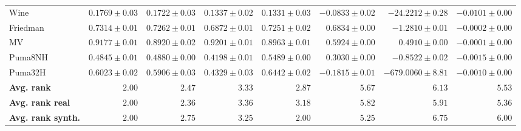 \begin{table*}[!htbp]
{\begin{tabular}{lrrrrrrr}
		Wine & $\mathbf{0.1769 \pm 0.03}$ & $0.1722 \pm 0.03$ & $0.1337 \pm 0.02$ & $0.1331 \pm 0.03$ & $-0.0833 \pm 0.02$ & $-24.2212 \pm 0.28$ & $-0.0101 \pm 0.00$\\
		Friedman & $\mathbf{0.7314 \pm 0.01}$ & $0.7262 \pm 0.01$ & $0.6872 \pm 0.01$ & $0.7251 \pm 0.02$ & $0.6834 \pm 0.00$ & $-1.2810 \pm 0.01$ & $-0.0002 \pm 0.00$\\
		MV & $0.9177 \pm 0.01$ & $0.8920 \pm 0.02$ & $\mathbf{0.9201 \pm 0.01}$ & $0.8963 \pm 0.01$ & $0.5924 \pm 0.00$ & $0.4910 \pm 0.00$ & $-0.0001 \pm 0.00$\\
		Puma8NH & $0.4845 \pm 0.01$ & $0.4880 \pm 0.00$ & $0.4198 \pm 0.01$ & $\mathbf{0.5489 \pm 0.00}$ & $0.3030 \pm 0.00$ & $-0.8522 \pm 0.02$ & $-0.0015 \pm 0.00$\\
		Puma32H & $0.6023 \pm 0.02$ & $0.5906 \pm 0.03$ & $0.4329 \pm 0.03$ & $\mathbf{0.6442 \pm 0.02}$ & $-0.1815 \pm 0.01$ & $-679.0060 \pm 8.81$ & $-0.0010 \pm 0.00$\\
		\midrule
		\textbf{{Avg. rank}} & $\mathbf{2.00}$ & $2.47$ & $3.33$ & $2.87$ & $5.67$ & $6.13$ & $5.53$\\
		\textbf{{Avg. rank real}} & $\mathbf{2.00}$ & $2.36$ & $3.36$ & $3.18$ & $5.82$ & $5.91$ & $5.36$\\
		\textbf{{Avg. rank synth.}} & $\mathbf{2.00}$ & $2.75$ & $3.25$ & $\mathbf{2.00}$ & $5.25$ & $6.75$ & $6.00$\\
		\bottomrule
	\end{tabular}}
\end{table*}

